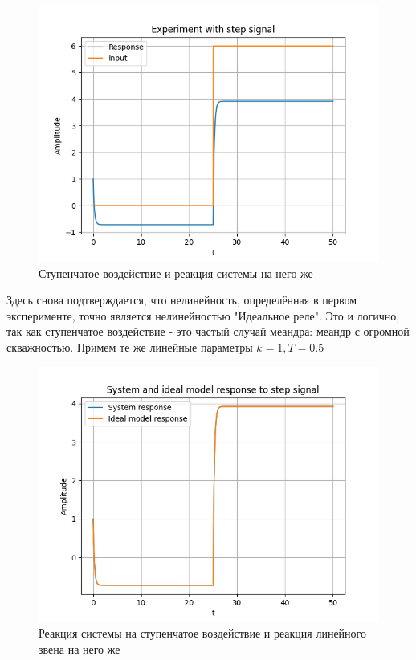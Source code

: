 \begin{figure}[H]
	\centering
	\includegraphics[width=1\linewidth]{body/images/Experiment-with-step-signal.png}
	\caption{Ступенчатое воздействие и реакция системы на него же}
	\label{fig:14}
\end{figure}

Здесь снова подтверждается, что нелинейность, определённая в первом эксперименте, точно является нелинейностью "Идеальное реле". Это и логично, так как ступенчатое воздействие - это
частый случай меандра: меандр с огромной скважностью. Примем те же линейные параметры $ k = 1, T = 0.5 $

\begin{figure}[H]
	\centering
	\includegraphics[width=1\linewidth]{body/images/System-and-ideal-model-response-to-step-signal.png}
	\caption{Реакция системы на ступенчатое воздействие и реакция линейного звена на него же}
	\label{fig:15}
\end{figure}

